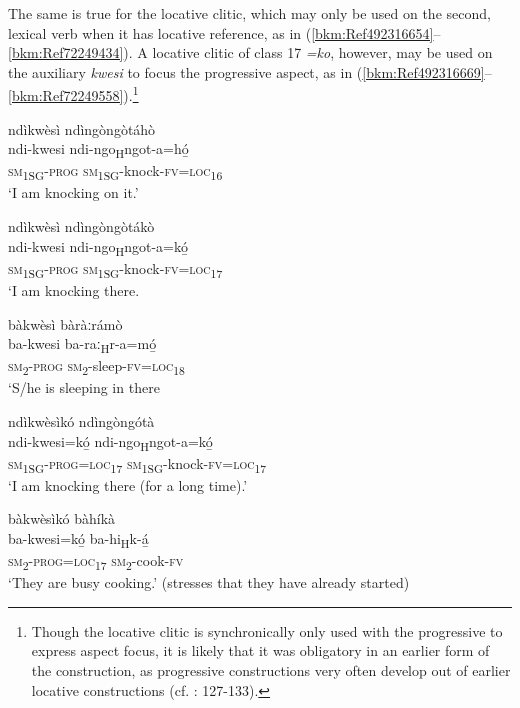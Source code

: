 The same is true for the locative clitic, which may only be used on the second, lexical verb when it has locative reference, as in (\ref{bkm:Ref492316654}--\ref{bkm:Ref72249434}). A locative clitic of class 17 \textit{=ko}, however, may be used on the auxiliary \textit{kwesi} to focus the progressive aspect, as in (\ref{bkm:Ref492316669}--\ref{bkm:Ref72249558}).\footnote{Though the locative clitic is synchronically only used with the progressive to express aspect focus, it is likely that it was obligatory in an earlier form of the construction, as progressive constructions very often develop out of earlier locative constructions (cf. \citealt{BybeeEtAl1994}: 127-133).}

\ea
\label{bkm:Ref492316654}
ndìkwèsì ndìngòngòtáhò\\
\gll ndi-kwesi  ndi-ngo\textsubscript{H}ngot-a=hó̲\\
\textsc{sm}\textsubscript{1SG}-\textsc{prog}  \textsc{sm}\textsubscript{1SG}-knock-\textsc{fv}=\textsc{loc}\textsubscript{16}\\
\glt ‘I am knocking on it.’
\z

\ea
ndìkwèsì ndìngòngòtákò\\
\gll ndi-kwesi  ndi-ngo\textsubscript{H}ngot-a=kó̲\\
\textsc{sm}\textsubscript{1SG}-\textsc{prog}  \textsc{sm}\textsubscript{1SG}-knock-\textsc{fv}=\textsc{loc}\textsubscript{17}\\
\glt ‘I am knocking there.
\z

\ea
\label{bkm:Ref72249434}
bàkwèsì bàràːrámò\\
\gll ba-kwesi  ba-raː\textsubscript{H}r-a=mó̲\\
\textsc{sm}\textsubscript{2}-\textsc{prog}  \textsc{sm}\textsubscript{2}-sleep-\textsc{fv}=\textsc{loc}\textsubscript{18}\\
\glt ‘S/he is sleeping in there
\z

\ea
\label{bkm:Ref492316669}
ndìkwèsìkó ndìngòngótà\\
\gll ndi-kwesi=kó̲  ndi-ngo\textsubscript{H}ngot-a=kó̲\\
\textsc{sm}\textsubscript{1SG}-\textsc{prog}=\textsc{loc}\textsubscript{17}  \textsc{sm}\textsubscript{1SG}-knock-\textsc{fv}=\textsc{loc}\textsubscript{17}\\
\glt ‘I am knocking there (for a long time).’
\z

\ea
bàkwèsìkó bàhíkà\\
\gll ba-kwesi=kó̲    ba-hi\textsubscript{H}k-á̲\\
\textsc{sm}\textsubscript{2}-\textsc{prog}=\textsc{loc}\textsubscript{17}  \textsc{sm}\textsubscript{2}-cook-\textsc{fv}\\
\glt ‘They are busy cooking.’ (stresses that they have already started)
\z

